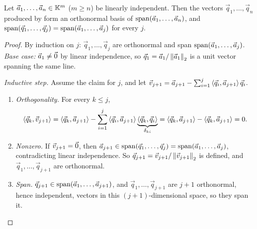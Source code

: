 \begin{theorem}
  \label{thm:gs}
  Let $\vec{a}_1, \dots, \vec{a}_n \in \mathbb{K}^m$ ($m \ge n$) be linearly independent. Then the vectors $\vec{q}_1, \dots, \vec{q}_n$ produced by  form an orthonormal basis of $\operatorname{span}(\vec{a}_1, \dots, \vec{a}_n)$, and $\operatorname{span}(\vec{q}_1, \dots, \vec{q}_j) = \operatorname{span}(\vec{a}_1, \dots, \vec{a}_j)$ for every $j$.
\end{theorem}

\begin{proof}
  By induction on $j$: $\vec{q}_1, \dots, \vec{q}_j$ are orthonormal and span $\operatorname{span}(\vec{a}_1, \dots, \vec{a}_j)$. \emph{Base case:} $\vec{a}_1 \ne \vec{0}$ by linear independence, so $\vec{q}_1 = \vec{a}_1 / \left\lVert \vec{a}_1 \right\rVert_2$ is a unit vector spanning the same line.

  \emph{Inductive step.} Assume the claim for $j$, and let $\vec{v}_{j+1} = \vec{a}_{j+1} - \sum_{i=1}^{j}\left\langle \vec{q}_i, \vec{a}_{j+1} \right\rangle\vec{q}_i$.
  \begin{enumerate}
    \item \emph{Orthogonality.} For every $k \le j$,
    \begin{equation}
      \left\langle \vec{q}_k, \vec{v}_{j+1} \right\rangle
      = \left\langle \vec{q}_k, \vec{a}_{j+1} \right\rangle - \sum_{i=1}^{j}\left\langle \vec{q}_i, \vec{a}_{j+1} \right\rangle\underbrace{\left\langle \vec{q}_k, \vec{q}_i \right\rangle}_{\delta_{ki}}
      = \left\langle \vec{q}_k, \vec{a}_{j+1} \right\rangle - \left\langle \vec{q}_k, \vec{a}_{j+1} \right\rangle = 0.
    \end{equation}
    \item \emph{Nonzero.} If $\vec{v}_{j+1} = \vec{0}$, then $\vec{a}_{j+1} \in \operatorname{span}(\vec{q}_1, \dots, \vec{q}_j) = \operatorname{span}(\vec{a}_1, \dots, \vec{a}_j)$, contradicting linear independence. So $\vec{q}_{j+1} = \vec{v}_{j+1} / \left\lVert \vec{v}_{j+1} \right\rVert_2$ is defined, and $\vec{q}_1, \dots, \vec{q}_{j+1}$ are orthonormal.
    \item \emph{Span.} $\vec{q}_{j+1} \in \operatorname{span}(\vec{a}_1, \dots, \vec{a}_{j+1})$, and $\vec{q}_1, \dots, \vec{q}_{j+1}$ are $j + 1$ orthonormal, hence independent, vectors in this $(j + 1)$-dimensional space, so they span it. \qedhere
  \end{enumerate}
\end{proof}

